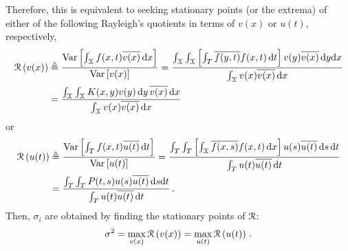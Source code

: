 \documentclass[10pt]{article}
\newcommand{\norm}[1]{\left\Vert#1\right\Vert}
\begin{document}
Therefore, this is equivalent to seeking stationary points (or the extrema) of either of the following Rayleigh's quotients in terms of $v(x)$ or $u(t)$, respectively,
\begin{equation}
\begin{aligned}
    {\cal R}\left(v(x)\right) 
    &\triangleq
    \frac{
    \mathrm{Var}\left[ 
    \int_{\cal X}  f(x,t) \overline{v(x)}\, \mathrm{d}x \right] 
    }{ 
    \mathrm{Var}\left[ v(x) \right]         }
     = 
    \frac{
    \int_{\cal X} \int_{\cal X} \left[
    \int_T \overline{f(y,t)}f(x,t)\, \mathrm{d}t\right] v(y)\overline{v(x)}\, \mathrm{d}y  \mathrm{d}x  
    }{
    \int_{\cal X} v(x) \overline{v(x)} \, \mathrm{d}x
        }\\
        & = 
    \frac{
    \int_{\cal X} \int_{\cal X} K(x,y) v(y) \, \mathrm{d}y\, \overline{v(x)}\,  \mathrm{d}x  
    }{ 
    \int_{\cal X} v(x) \overline{v(x)} \, \mathrm{d}x
        }
\end{aligned}
\end{equation}
or
\begin{equation}
\begin{aligned}
    {\cal R} \left(
    u(t)
    \right) 
    &\triangleq
    \frac{
    \mathrm{Var}\left[ %
    \int_T  f(x,t) \overline{u(t)}\, \mathrm{d}t \right] 
    }{ 
    \mathrm{Var} \left[ u(t) \right]
        }
     = 
    \frac{
    \int_T \int_T \left[
    \int_{\cal X} \overline{f(x,s)} f(x,t)\, \mathrm{d}x
    \right] 
    u(s)\overline{u(t)}\, \mathrm{d} s\,  \mathrm{d} t  
    }{ %
    \int_T u(t)\overline{u(t)}\, \mathrm{d}t        }\\
        & = 
    \frac{
    \int_T \int_T P(t, s) u(s)\overline{u(t)}\, \mathrm{d}s  \mathrm{d}t
    }{ %
    \int_T u(t)\overline{u(t)}\, \mathrm{d}t
        }\,.
\end{aligned}
\end{equation}
Then, $\sigma_{i}$ are obtained by finding the stationary points of  ${\cal R}$:
\begin{equation}\label{Rmax}
    \sigma^2 = \underset{v(x)}{\max} \,{\cal R}\left(v(x)\right)=\underset{u(t)}{\max}\, {\cal R}\left(u(t)\right)\,.
\end{equation}
\end{document}
